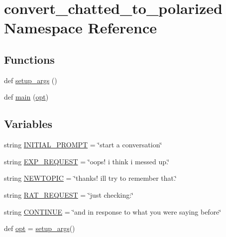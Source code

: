 \hypertarget{namespaceconvert__chatted__to__polarized}{}\section{convert\+\_\+chatted\+\_\+to\+\_\+polarized Namespace Reference}
\label{namespaceconvert__chatted__to__polarized}
\subsection*{Functions}
\begin{DoxyCompactItemize}
\item 
def \hyperlink{namespaceconvert__chatted__to__polarized_a1318d32a7ea5fa636f9e29e8e92b2833}{setup\+\_\+args} ()
\item 
def \hyperlink{namespaceconvert__chatted__to__polarized_aadba9ee59fc962ba83f4c31a22d4c28d}{main} (\hyperlink{namespaceconvert__chatted__to__polarized_a6bd35917e096a6c4a1756db1ac134f99}{opt})
\end{DoxyCompactItemize}
\subsection*{Variables}
\begin{DoxyCompactItemize}
\item 
string \hyperlink{namespaceconvert__chatted__to__polarized_a5d9d308ac90c97cbc7a5ecf960208b80}{I\+N\+I\+T\+I\+A\+L\+\_\+\+P\+R\+O\+M\+PT} = \char`\"{}start a conversation\char`\"{}
\item 
string \hyperlink{namespaceconvert__chatted__to__polarized_afdb74da6446c7fd9ed87b0331e07e2b2}{E\+X\+P\+\_\+\+R\+E\+Q\+U\+E\+ST} = \char`\"{}oops! i think i messed up.\char`\"{}
\item 
string \hyperlink{namespaceconvert__chatted__to__polarized_a9614b853f8f2316f687e3003b6e66e82}{N\+E\+W\+T\+O\+P\+IC} = \char`\"{}thanks! i\textquotesingle{}ll try to remember that.\char`\"{}
\item 
string \hyperlink{namespaceconvert__chatted__to__polarized_ac07ae61db0ef5d7b1b9b20fc2d85aae5}{R\+A\+T\+\_\+\+R\+E\+Q\+U\+E\+ST} = \char`\"{}just checking\+:\char`\"{}
\item 
string \hyperlink{namespaceconvert__chatted__to__polarized_aa93c711ce445e91cd463ee6f76a6dc47}{C\+O\+N\+T\+I\+N\+UE} = \char`\"{}and in response to what you were saying before\char`\"{}
\item 
def \hyperlink{namespaceconvert__chatted__to__polarized_a6bd35917e096a6c4a1756db1ac134f99}{opt} = \hyperlink{namespaceconvert__chatted__to__polarized_a1318d32a7ea5fa636f9e29e8e92b2833}{setup\+\_\+args}()
\end{DoxyCompactItemize}


